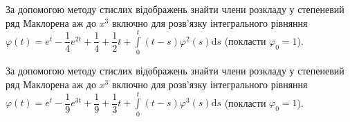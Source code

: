\documentclass[12pt]{extarticle}
\begin{document}
\begin{Exercise}
За допомогою методу стислих відображень знайти члени розкладу у степеневий ряд Маклорена аж до $x^3$ включно для розв’язку інтегрального рівняння $\varphi (t) = e^t - \dfrac{1}{4} e^{2t} + \dfrac{1}{4} + \dfrac{1}{2} t + \int\limits_{0}^{t} (t-s) \varphi^2(s) \mathrm{d}s$ (покласти $\varphi_0 = 1$).
\end{Exercise}

\begin{Exercise}
За допомогою методу стислих відображень знайти члени розкладу у степеневий ряд Маклорена аж до $x^3$ включно для розв’язку інтегрального рівняння $\varphi (t) = e^t - \dfrac{1}{9} e^{3t} + \dfrac{1}{9} + \dfrac{1}{3} t + \int\limits_{0}^{t} (t-s) \varphi^3(s) \mathrm{d}s$ (покласти $\varphi_0 = 1$).
\end{Exercise}
\end{document}
